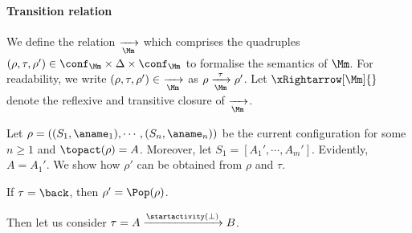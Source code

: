 	
	\paragraph{Transition relation} We define the relation $\xrightarrow[\Mm]{}$ which comprises the quadruples $(\rho, \tau, \rho') \in \conf_\Mm \times \Delta  \times \conf_\Mm$ to formalise the semantics of $\Mm$. For readability, we write $(\rho, \tau, \rho')\in\ \xrightarrow[\Mm]{}$  as $\rho \xrightarrow[\Mm]{\tau} \rho'$. 
	Let $\xRightarrow[\Mm]{}$ denote the reflexive and transitive closure of $\xrightarrow[\Mm]{}$.
	
	Let $\rho = ((S_1,\aname_1),\cdots,(S_n,\aname_n))$ be the current configuration for some $n \ge 1$ and $\topact(\rho) = A$. Moreover, let $S_1 = [A_1',\cdots,A_m']$. Evidently, $A = A_1'$. We show how $\rho'$ can be obtained from $\rho$ and $\tau$.
	
	If $\tau = \back$, then $\rho' = \Pop(\rho)$. 
	
	Then let us consider $\tau = A\xrightarrow{\startactivity(\bot)}B$.
	
	
	
	
	
	
	
